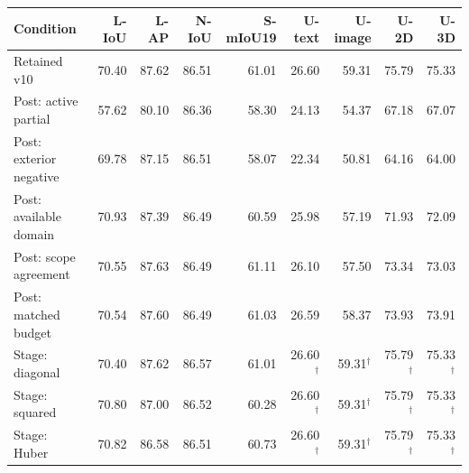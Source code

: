 \begin{tabular}{lrrrrrrrr}
\toprule
Condition & L-IoU & L-AP & N-IoU & S-mIoU19 & U-text & U-image & U-2D & U-3D \\
\midrule
Retained v10 & 70.40 & 87.62 & 86.51 & 61.01 & 26.60 & 59.31 & 75.79 & 75.33 \\
Post: active partial & 57.62 & 80.10 & 86.36 & 58.30 & 24.13 & 54.37 & 67.18 & 67.07 \\
Post: exterior negative & 69.78 & 87.15 & 86.51 & 58.07 & 22.34 & 50.81 & 64.16 & 64.00 \\
Post: available domain & 70.93 & 87.39 & 86.49 & 60.59 & 25.98 & 57.19 & 71.93 & 72.09 \\
Post: scope agreement & 70.55 & 87.63 & 86.49 & 61.11 & 26.10 & 57.50 & 73.34 & 73.03 \\
Post: matched budget & 70.54 & 87.60 & 86.49 & 61.03 & 26.59 & 58.37 & 73.93 & 73.91 \\
Stage: diagonal & 70.40 & 87.62 & 86.57 & 61.01 & 26.60$^\dagger$ & 59.31$^\dagger$ & 75.79$^\dagger$ & 75.33$^\dagger$ \\
Stage: squared & 70.80 & 87.00 & 86.52 & 60.28 & 26.60$^\dagger$ & 59.31$^\dagger$ & 75.79$^\dagger$ & 75.33$^\dagger$ \\
Stage: Huber & 70.82 & 86.58 & 86.51 & 60.73 & 26.60$^\dagger$ & 59.31$^\dagger$ & 75.79$^\dagger$ & 75.33$^\dagger$ \\
\bottomrule
\end{tabular}
